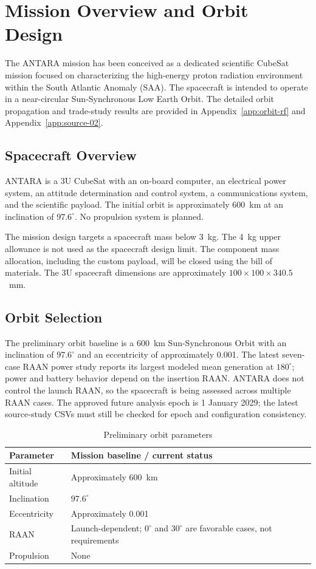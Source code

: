 \section{Mission Overview and Orbit Design}\label{sec:mission-overview}
The ANTARA mission has been conceived as a dedicated scientific CubeSat mission focused on characterizing the high-energy proton radiation environment within the South Atlantic Anomaly (SAA). The spacecraft is intended to operate in a near-circular Sun-Synchronous Low Earth Orbit. The detailed orbit propagation and trade-study results are provided in Appendix~\ref{app:orbit-rf} and Appendix~\ref{app:source-02}.

\subsection{Spacecraft Overview}\label{spacecraft-overview}
ANTARA is a 3U CubeSat with an on-board computer, an electrical power system, an attitude determination and control system, a communications system, and the scientific payload. The initial orbit is approximately 600~km at an inclination of $97.6^\circ$. No propulsion system is planned.

The mission design targets a spacecraft mass below 3~kg. The 4~kg upper allowance is not used as the spacecraft design limit. The component mass allocation, including the custom payload, will be closed using the bill of materials. The 3U spacecraft dimensions are approximately $100\times100\times340.5$~mm.

\subsection{Orbit Selection}\label{sec:orbit-design}
The preliminary orbit baseline is a 600~km Sun-Synchronous Orbit with an inclination of $97.6^\circ$ and an eccentricity of approximately 0.001. The latest seven-case RAAN power study reports its largest modeled mean generation at $180^\circ$; power and battery behavior depend on the insertion RAAN. ANTARA does not control the launch RAAN, so the spacecraft is being assessed across multiple RAAN cases. The approved future analysis epoch is 1 January 2029; the latest source-study CSVs must still be checked for epoch and configuration consistency.

\begin{table}[htbp]\centering
\caption{Preliminary orbit parameters}\label{tab:orbit-baseline}
\begin{tabularx}{\linewidth}{@{}lX@{}}\toprule
Parameter & Mission baseline / current status \\ \midrule
Initial altitude & Approximately 600~km \\
Inclination & $97.6^\circ$ \\
Eccentricity & Approximately 0.001 \\
RAAN & Launch-dependent; $0^\circ$ and $30^\circ$ are favorable cases, not requirements \\
Propulsion & None \\
\bottomrule\end{tabularx}\end{table}

